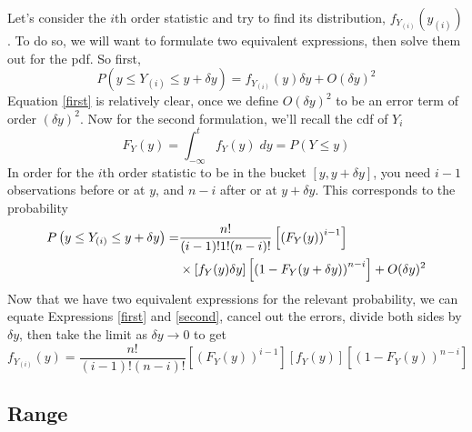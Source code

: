 \documentclass[a4paper,12pt]{scrartcl}
\begin{document}
Let's consider the $i$th order statistic and try to find its 
distribution, $f_{Y_{(i)}}\left(y_{(i)}\right)$. To do so, we will
want to formulate two equivalent expressions, then solve them out for
the pdf. So first,
\begin{equation}
   \label{first}
   P\left(y \leq Y_{(i)} \leq y + \delta y\right) = 
      f_{Y_{(i)}}\left(y\right)\delta y + O(\delta y)^2 
\end{equation}
Equation \ref{first} is relatively clear, once we define $O(\delta y)^2$
to be an error term of order $(\delta y)^2$.  Now for the second 
formulation, we'll recall the cdf of $Y_i$ 
\begin{equation}
   F_Y(y) = \int^t_{-\infty} f_Y(y) \; dy = P(Y \leq y) 
\end{equation}
In order for the $i$th order statistic to be in the bucket 
$[y, y+\delta y]$, you need $i-1$ observations before or at $y$,
and $n-i$ after or at $y+ \delta y$. This corresponds to the 
probability
\begin{align}
      \label{second}
      P\left(y \leq Y_{(i)} \leq y + \delta y\right) = 
      &\frac{n!}{(i-1)!1!(n-i)!}\left[\left(F_Y(y)\right)^{i-1}\right]
      \notag\\ 
      &\times\left[f_Y(y)\delta y\right]
      \left[\left(1 - F_Y(y + \delta y)\right)^{n-i}\right] + 
      O(\delta y)^2 
\end{align} 
Now that we have two equivalent expressions for the relevant probability,
we can equate Expressions \ref{first} and \ref{second}, cancel out the
errors, divide both sides by $\delta y$, then take the limit as 
$\delta y \rightarrow 0$ to get
\begin{equation}
   \label{orderpdf}
   f_{Y_{(i)}}\left(y\right) = \frac{n!}{(i-1)!(n-i)!} 
   \left[\left(F_Y(y)\right)^{i-1}\right]
   \left[f_Y(y)\right]
   \left[\left(1 - F_Y(y)\right)^{n-i}\right]
\end{equation}

\subsection{Range}
\end{document}
